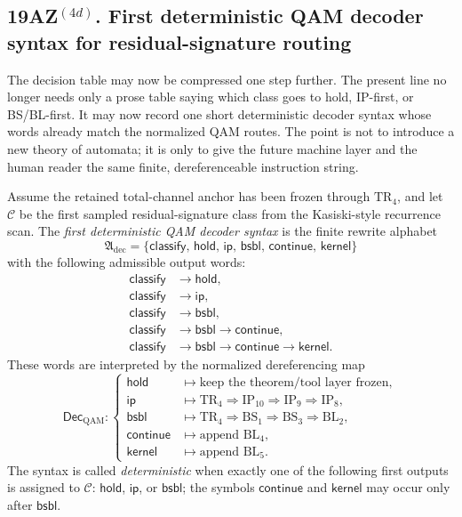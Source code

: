 \subsection*{19AZ$^{(4d)}$. First deterministic QAM decoder syntax for residual-signature routing}
\label{sec:first-deterministic-qam-decoder-syntax-residual-signature-routing}
The decision table may now be compressed one step further. The present line no longer needs only a prose table saying which class goes to hold, IP-first, or BS/BL-first. It may now record one short deterministic decoder syntax whose words already match the normalized QAM routes. The point is not to introduce a new theory of automata; it is only to give the future machine layer and the human reader the same finite, dereferenceable instruction string.

\begin{definition}
\label{def:first-deterministic-qam-decoder-syntax}
Assume the retained total-channel anchor has been frozen through \(\mathrm{TR}_4\), and let \(\mathcal C\) be the first sampled residual-signature class from the Kasiski-style recurrence scan. The \emph{first deterministic QAM decoder syntax} is the finite rewrite alphabet
\[
\mathfrak A_{\mathrm{dec}}=\bigl\{\mathsf{classify},\,\mathsf{hold},\,\mathsf{ip},\,\mathsf{bsbl},\,\mathsf{continue},\,\mathsf{kernel}\bigr\}
\]
with the following admissible output words:
\[
\begin{aligned}
\mathsf{classify}  &\to\mathsf{hold},\\
\mathsf{classify}  &\to\mathsf{ip},\\
\mathsf{classify}  &\to\mathsf{bsbl},\\
\mathsf{classify}  &\to\mathsf{bsbl}\to\mathsf{continue},\\
\mathsf{classify}  &\to\mathsf{bsbl}\to\mathsf{continue}\to\mathsf{kernel}.
\end{aligned}
\]
These words are interpreted by the normalized dereferencing map
\[
\mathsf{Dec}_{\mathrm{QAM}}:
\begin{cases}
\mathsf{hold} &\mapsto \text{keep the theorem/tool layer frozen},\\[0.3em]
\mathsf{ip} &\mapsto \mathrm{TR}_4 \Rightarrow \mathrm{IP}_{10} \Rightarrow \mathrm{IP}_9 \Rightarrow \mathrm{IP}_8,\\[0.3em]
\mathsf{bsbl} &\mapsto \mathrm{TR}_4 \Rightarrow \mathrm{BS}_1 \Rightarrow \mathrm{BS}_3 \Rightarrow \mathrm{BL}_2,\\[0.3em]
\mathsf{continue} &\mapsto \text{append }\mathrm{BL}_4,\\[0.3em]
\mathsf{kernel} &\mapsto \text{append }\mathrm{BL}_5.
\end{cases}
\]
The syntax is called \emph{deterministic} when exactly one of the following first outputs is assigned to \(\mathcal C\): \(\mathsf{hold}\), \(\mathsf{ip}\), or \(\mathsf{bsbl}\); the symbols \(\mathsf{continue}\) and \(\mathsf{kernel}\) may occur only after \(\mathsf{bsbl}\).
\end{definition}

